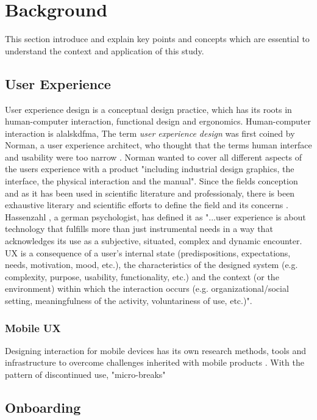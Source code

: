 \chapter{Background}
\label{chap:background}
This section introduce and explain key points and concepts which are essential to understand the context and application of this study.

\section{User Experience}
User experience design is a conceptual design practice, which has its roots in human-computer interaction, functional design and ergonomics. Human-computer interaction is alalskdfma, The term \textit{user experience design} was first coined by Norman, a user experience architect, who thought that the terms human interface and usability were too narrow \cite{Merholz2008}. Norman wanted to cover all different aspects of the users experience with a product "including industrial design graphics, the interface, the physical interaction and the manual". Since the fields conception and as it has been used in scientific literature and professionaly, there is been exhaustive literary and scientific efforts to define the field and its concerns \cite{Law2008} \cite{Law2009} \cite{Forlizzi2000}. Hassenzahl \cite{Hassenzahl2006}, a german psychologist, has defined it as "...user experience is about technology that fulfills more than just instrumental needs in a way that acknowledges its use as a subjective, situated, complex and dynamic encounter. UX is a consequence of a user’s internal state (predispositions, expectations, needs, motivation, mood, etc.), the characteristics of the designed system (e.g. complexity, purpose, usability, functionality, etc.) and the context (or the environment) within which the interaction occurs (e.g. organizational/social setting, meaningfulness of the activity, voluntariness of use, etc.)".

\subsection{Mobile UX}
Designing interaction for mobile devices has its own research methods, tools and infrastructure to overcome challenges inherited with mobile products \cite{Nakhimovsky2009}. With the pattern of discontinued use, "micro-breaks" \cite{McGregor2014a}
\section{Onboarding}

